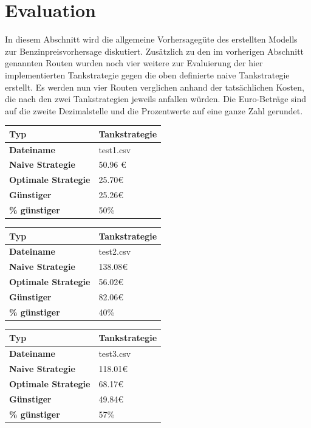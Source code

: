 \documentclass[
ngerman          %
,a4paper          %
,11pt
,pdftex
]{report}
\begin{document}
\section{Evaluation}
In diesem Abschnitt wird die allgemeine Vorhersagegüte des erstellten Modells zur Benzinpreisvorhersage diskutiert. Zusätzlich zu den im vorherigen Abschnitt genannten Routen wurden noch vier weitere zur Evaluierung der hier implementierten Tankstrategie gegen die oben definierte naive Tankstrategie erstellt. Es werden nun vier Routen verglichen anhand der tatsächlichen Kosten, die nach den zwei Tankstrategien jeweils anfallen würden. Die Euro-Beträge sind auf die zweite Dezimalstelle und die Prozentwerte auf eine ganze Zahl gerundet.

\begin{table}[H]
	\centering
	\begin{tabular}{l l}
		\textbf{Typ} & \textbf{Tankstrategie} \\ 
		\hline
		\hline
		\textbf{Dateiname} & test1.csv \\
        \textbf{Naive Strategie} & 50.96 \euro{} \\
        \textbf{Optimale Strategie} & 25.70\euro{} \\
  		\textbf{Günstiger} & 25.26\euro{} \\
        \textbf{\% günstiger} & 50\% \\
		\hline 
	\end{tabular}
\end{table} 

\begin{table}[H]
	\centering
	\begin{tabular}{l l}
		\textbf{Typ} & \textbf{Tankstrategie} \\ 
		\hline
		\hline
		\textbf{Dateiname} & test2.csv \\
        \textbf{Naive Strategie} & 138.08\euro{} \\
        \textbf{Optimale Strategie} & 56.02\euro{} \\
  		\textbf{Günstiger} & 82.06\euro{} \\
        \textbf{\% günstiger} & 40\% \\
		\hline 
	\end{tabular}
\end{table} 

\begin{table}[H]
	\centering
	\begin{tabular}{l l}
		\textbf{Typ} & \textbf{Tankstrategie} \\ 
		\hline
		\hline
		\textbf{Dateiname} & test3.csv \\
        \textbf{Naive Strategie} & 118.01\euro{} \\
        \textbf{Optimale Strategie} & 68.17\euro{} \\
  		\textbf{Günstiger} & 49.84\euro{} \\
        \textbf{\% günstiger} & 57\% \\
		\hline 
	\end{tabular}
\end{table} 
\end{document}
